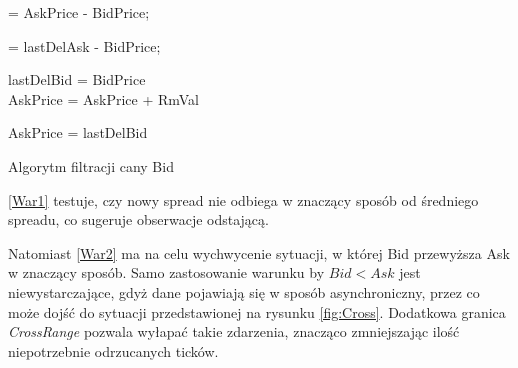 \documentclass[a4paper,12pt,openany, DIV=calc, headsepline]{scrbook}
\begin{document}
\IncMargin{5em}
\begin{algorithm}

\Spt = AskPrice - BidPrice; 



\label{War1}
{
\label{Zab1}	\Spt = lastDelAsk - BidPrice; 

	{
		lastDelBid = BidPrice\\
\label{Zab2} AskPrice = AskPrice + RmVal\\


	
	}
	
\label{Uwaga1}	AskPrice = lastDelBid
	
}

\caption{Algorytm filtracji cany Bid\label{FiltrBID}}
\end{algorithm}
\DecMargin{5em}

\ref{War1} testuje, czy nowy spread nie odbiega w znaczący sposób od średniego spreadu, co sugeruje obserwacje odstającą. 

Natomiast \ref{War2} ma na celu wychwycenie sytuacji, w której Bid przewyższa Ask w znaczący sposób. Samo zastosowanie warunku by $Bid < Ask$ jest niewystarczające, gdyż dane pojawiają się w sposób asynchroniczny, przez co może dojść do sytuacji przedstawionej na rysunku \ref{fig:Cross}. Dodatkowa granica \emph{CrossRange} pozwala wyłapać takie zdarzenia, znacząco zmniejszając ilość niepotrzebnie odrzucanych ticków.
\end{document}
